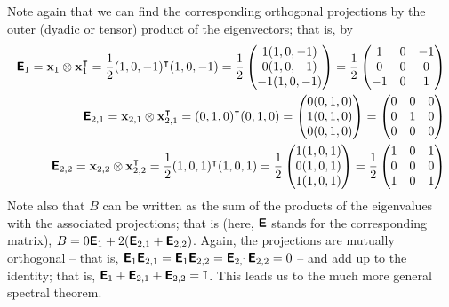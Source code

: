 {Note again that we can find the corresponding orthogonal projections by the outer (dyadic or tensor) product
of the eigenvectors; that is,  by
\begin{equation}
\begin{split}
\textsf{\textbf{E}}_1 =
{\bf x}_1 \otimes {\bf x}_1^\intercal  =
\frac{1}{2} (1,0,-1)^\intercal (1,0,-1) =
\frac{1}{2}
\begin{pmatrix}
1(1,0,-1)\\
0(1,0,-1)\\
-1(1,0,-1)
\end{pmatrix} =
\frac{1}{2}
\begin{pmatrix}
1&0&-1\\
0&0&0\\
-1&0&1
\end{pmatrix}
\\
\textsf{\textbf{E}}_{2,1} =
{\bf x}_{2,1} \otimes {\bf x}_{2,1}^\intercal  =
(0,1,0)^\intercal (0,1,0) =
\begin{pmatrix}
0(0,1,0)\\
1(0,1,0)\\
0(0,1,0)
\end{pmatrix} =
\begin{pmatrix}
0&0&0\\
0&1&0\\
0&0&0
\end{pmatrix}
\\
\textsf{\textbf{E}}_{2,2} =
{\bf x}_{2,2} \otimes {\bf x}_{2,2}^\intercal  =
\frac{1}{2} (1,0,1)^\intercal (1,0,1) =
\frac{1}{2}
\begin{pmatrix}
1(1,0,1)\\
0(1,0,1)\\
1(1,0,1)
\end{pmatrix} =
\frac{1}{2}
\begin{pmatrix}
1&0&1\\
0&0&0\\
1&0&1
\end{pmatrix}
\end{split}
\end{equation}
Note also that $B$ can be written as the sum of the products of the
eigenvalues with the associated projections; that is (here, $\textsf{\textbf{E}}$
stands for the corresponding matrix),
$B= 0  \textsf{\textbf{E}}_1 + 2 (\textsf{\textbf{E}}_{2,1} + \textsf{\textbf{E}}_{2,2} )$.
Again, the projections are mutually orthogonal
-- that is,
$\textsf{\textbf{E}}_1 \textsf{\textbf{E}}_{2,1} = \textsf{\textbf{E}}_1\textsf{\textbf{E}}_{2,2}=
\textsf{\textbf{E}}_{2,1}\textsf{\textbf{E}}_{2,2}=0$
--
and add up to the identity; that is,
$\textsf{\textbf{E}}_1+\textsf{\textbf{E}}_{2,1}+\textsf{\textbf{E}}_{2,2}={\Bbb I}$.
This leads us to the much more general spectral theorem.

}
